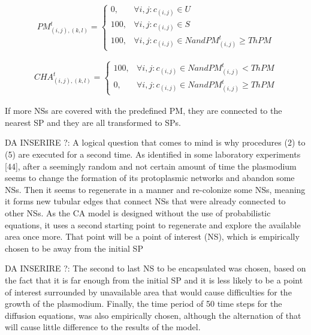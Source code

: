 \begin{equation}
PM^t_{(i, j),(k,l)}=
\begin{cases} 
0, & \forall i, j: c_{(i,j)} \in U \\ 
100, & \forall i, j: c_{(i,j)} \in S \\ 
100, & \forall i, j: c_{(i,j)} \in N and  PM^t_{(i, j)} \geq ThPM 
\end{cases}
\end{equation}

\begin{align}
CHA^t_{(i, j),(k,l)}=
\begin{cases} 
100, & \forall i, j: c_{(i,j)} \in N and PM^t_{(i, j)} < ThPM\\ 
0, & \forall i, j: c_{(i,j)} \in N and  PM^t_{(i, j)} \geq ThPM 
\end{cases}
\end{align}

If more NSs are covered with the predefined PM, they are connected to the nearest SP and they are all transformed to SPs.








\par


DA INSERIRE ?: A logical question that comes to mind is why procedures (2) to (5) are executed
for a second time. As identified in some laboratory experiments [44], after a seemingly
random and not certain amount of time the plasmodium seems to change the
formation of its protoplasmic networks and abandon some NSs. Then it seems to
regenerate in a manner and re-colonize some NSs, meaning it forms new tubular
edges that connect NSs that were already connected to other NSs. As the CA model
is designed without the use of probabilistic equations, it uses a second starting point
to regenerate and explore the available area once more. That point will be a point of
interest (NS), which is empirically chosen to be away from the initial SP

DA INSERIRE ?: The second to last NS to
be encapsulated was chosen, based on the fact that it is far enough from the initial
SP and it is less likely to be a point of interest surrounded by unavailable area that
would cause difficulties for the growth of the plasmodium. Finally, the time period
of 50 time steps for the diffusion equations, was also empirically chosen, although
the alternation of that will cause little difference to the results of the model.

